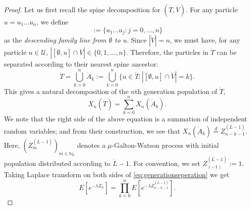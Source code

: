 \documentclass[12pt,a4paper]{amsart}
\numberwithin{equation}{section}
\begin{document}
\begin{proof}
	
	Let us first recall the spine decomposition for $(\dot T,\dot V)$.
	For any particle $u=u_1\dots u_n$, we define
\begin{equation*}
	[\emptyset, u]
	:= \{u_1\dots u_j:j=0,\dots, n \}
\end{equation*}
	as the \emph{descending family line from $\emptyset$ to $u$}.
	Since $|\dot V|=n$, we must have, for any particle $u\in\mathcal U$, $|[\emptyset, u]\cap\dot V|\in \{0,1,\dots,n\}$.
	Therefore, the particles in $\dot T$ can be separated according to their nearest spine ancestor:
\[
		\dot T
	=
		\bigcup_{k=0}^n\dot A_k
	:=
		\bigcup_{k=0}^n\{u\in\dot T:| [\emptyset, u] \cap \dot V |=k\}.
\]
	This gives a natural decomposition of the $n$th generation population of $\dot T$,
\begin{equation}
\label{eq:generationseperation}
		X_n(\dot T)
	=
		\sum_{k=0}^nX_n(\dot A_k).
\end{equation}
	We note that the right side of the above equation is a summation of independent random variables;
	and from their construction, we see that $X_n(\dot A_k) \overset{d}= Z_{n-k-1}^{(\dot L - 1)}$.
	Here,  $(Z^{(\dot L - 1)}_m)_{m\in \mathbb N_0}$ denotes a $\mu$-Galton-Watson process 
   	with initial population distributed according to $\dot L - 1$.
	For convention, we set $Z^{(\dot L - 1)}_{(-1)}:= 1$.
	Taking Laplace transform on both sides of \eqref{eq:generationseperation} we get
\begin{equation} \label{eq: laplace transform of one-spine decomposition}
	E [e^{-\lambda \dot Z_n}]
	= \prod_{k = 0}^n E[ e^{-\lambda Z^{(\dot L - 1)}_{n-k-1}} ].
\end{equation}
	

\end{proof}
\end{document}
